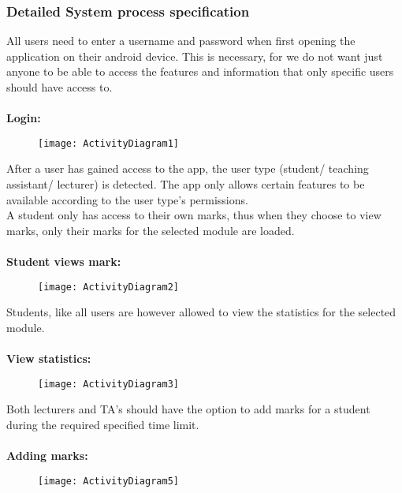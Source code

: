 \documentclass[12pt,a4paper]{article}
\begin{document}
\subsubsection{Detailed System process specification}
All users need to enter a username and password when first opening the application on their android device.  This is necessary, for we do not want just anyone to be able to access the features and information that only specific users should have access to.\\\\
\textbf {Login:}
\begin{figure}[h]
\begin{center}
\texttt{[image: ActivityDiagram1]}
\end{center}
\end{figure}

After a user has gained access to the app, the user type (student/ teaching assistant/ lecturer) is detected.  The app only allows certain features to be available according to the user type\textquoteright s permissions.
\\

A student only has access to their own marks, thus when they choose to view marks, only their marks for the selected module are loaded. \\
\\
\textbf {Student views mark:}
\begin{figure}[h]
\begin{center}
\texttt{[image: ActivityDiagram2]}
\end{center}
\end{figure} 

Students, like all users are however allowed to view the statistics for the selected module. \\
\\
\textbf {View statistics:}
\begin{figure}[h]
\begin{center}
\texttt{[image: ActivityDiagram3]}
\end{center}
\end{figure}  

\newpage
\newpage
Both lecturers and TA’s should have the option to add marks for a student during the required specified time limit.\\
\\
\textbf {Adding marks:}
\begin{figure}[h]
\begin{center}
\texttt{[image: ActivityDiagram5]}
\end{center}
\end{figure}
\end{document}
